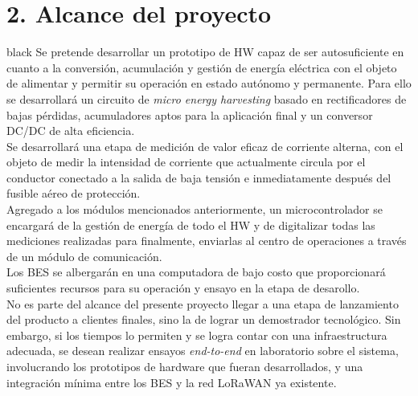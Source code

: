 \documentclass[11pt]{charter}
\begin{document}
\section{2. Alcance del proyecto}
\label{sec:alcance}

\begin{consigna}{black}
Se pretende desarrollar un prototipo de HW capaz de ser autosuficiente en cuanto a la conversión, acumulación y gestión de energía eléctrica con el objeto de alimentar y permitir su operación en estado autónomo y permanente. Para ello se desarrollará un circuito de \textit{micro energy harvesting} basado en rectificadores de bajas pérdidas, acumuladores aptos para la aplicación final y un conversor DC/DC de alta eficiencia.\\

Se desarrollará una etapa de medición de valor eficaz de corriente alterna, con el objeto de medir la intensidad de corriente que actualmente circula por el conductor conectado a la salida de baja tensión e inmediatamente después del fusible aéreo de protección.\\

Agregado a los módulos mencionados anteriormente, un microcontrolador se encargará de la gestión de energía de todo el HW y de digitalizar todas las mediciones realizadas para finalmente, enviarlas al centro de operaciones a través de un módulo de comunicación.\\

Los BES se albergarán en una computadora de bajo costo que proporcionará suficientes recursos para su operación y ensayo en la etapa de desarollo.\\

No es parte del alcance del presente proyecto llegar a una etapa de lanzamiento del producto a clientes finales, sino la de lograr un demostrador tecnológico. Sin embargo, si los tiempos lo permiten y se logra contar con una infraestructura adecuada, se desean realizar ensayos \textit{end-to-end} en laboratorio sobre el sistema, involucrando los prototipos de hardware que fueran desarrollados, y una integración mínima entre los BES y la red LoRaWAN ya existente.\\
\end{consigna}
\end{document}
